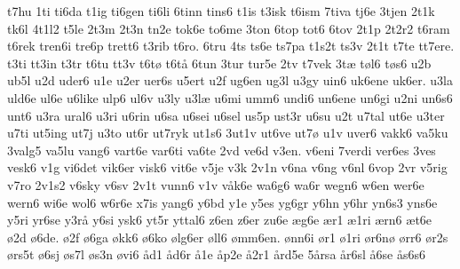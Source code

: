 {t7hu
1ti
ti6da
t1ig
ti6gen
ti6li
6tinn
tins6
t1is
t3isk
t6ism
7tiva
tj6e
3tjen
2t1k
tk6l
4t1l2
t5le
2t3m
2t3n
tn2e
tok6e
to6me
3ton
6top
tot6
6tov
2t1p
2t2r2
t6ram
t6rek
tren6i
tre6p
trett6
t3rib
t6ro.
6tru
4ts
ts6e
ts7pa
t1s2t
ts3v
2t1t
t7te
tt7ere.
t3ti
tt3in
t3tr
t6tu
tt3v
t6t^^f8
t6t^^e5
6tun
3tur
tur5e
2tv
t7vek
3t^^e6
t^^f8l6
t^^f8s6
u2b
ub5l
u2d
uder6
u1e
u2er
uer6s
u5ert
u2f
ug6en
ug3l
u3gy
uin6
uk6ene
uk6er.
u3la
uld6e
ul6e
u6like
ulp6
ul6v
u3ly
u3l^^e6
u6mi
umm6
undi6
un6ene
un6gi
u2ni
un6s6
unt6
u3ra
ural6
u3ri
u6rin
u6sa
u6sei
u6sel
us5p
ust3r
u6su
u2t
u7tal
ut6e
u3ter
u7ti
ut5ing
ut7j
u3to
ut6r
ut7ryk
ut1s6
3ut1v
ut6ve
ut7^^f8
u1v
uver6
vakk6
va5ku
3valg5
va5lu
vang6
vart6e
var6ti
va6te
2vd
ve6d
v3en.
v6eni
7verdi
ver6es
3ves
vesk6
v1g
vi6det
vik6er
visk6
vit6e
v5je
v3k
2v1n
v6na
v6ng
v6nl
6vop
2vr
v5rig
v7ro
2v1s2
v6sky
v6sv
2v1t
vunn6
v1v
v^^e5k6e
wa6g6
wa6r
wegn6
w6en
wer6e
wern6
wi6e
wol6
w6r6e
x7is
yang6
y6bd
y1e
y5es
yg6gr
y6hn
y6hr
yn6s3
yns6e
y5ri
yr6se
y3r^^e5
y6si
ysk6
yt5r
yttal6
z6en
z6er
zu6e
^^e6g6e
^^e6r1
^^e61ri
^^e6rn6
^^e6t6e
^^f82d
^^f86de.
^^f82f
^^f86ga
^^f8kk6
^^f86ko
^^f8lg6er
^^f8ll6
^^f8mm6en.
^^f8nn6i
^^f8r1
^^f81ri
^^f8r6n^^f8
^^f8rr6
^^f8r2s
^^f8rs5t
^^f86sj
^^f8s7l
^^f8s3n
^^f8vi6
^^e5d1
^^e5d6r
^^e51e
^^e5p2e
^^e52r1
^^e5rd5e
5^^e5rsa
^^e5r6sl
^^e56se
^^e5s6s6
} 
